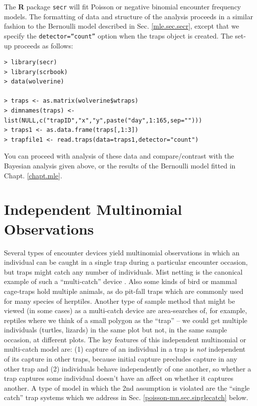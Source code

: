 The {\bf R} package \mbox{\tt secr} will fit Poisson or negative
binomial encounter frequency models. The formatting of data and
structure of the analysis proceeds in a similar fashion to the
Bernoulli model described in Sec. \ref{mle.sec.secr}, except that
we specify the \mbox{\tt detector=``count''} option when the traps
object is created. The set-up proceeds as follows:
\begin{samepage}
{\small
\begin{verbatim}
> library(secr)
> library(scrbook)
> data(wolverine)

> traps <- as.matrix(wolverine$wtraps)
> dimnames(traps) <- list(NULL,c("trapID","x","y",paste("day",1:165,sep="")))
> traps1 <- as.data.frame(traps[,1:3])
> trapfile1 <- read.traps(data=traps1,detector="count")
\end{verbatim}
}
\end{samepage}
You can proceed with analysis of these data and compare/contrast with
the Bayesian analysis given above, or the results of the Bernoulli
model fitted in Chapt. \ref{chapt.mle}.



\section{Independent Multinomial Observations}
\label{poisson-mn.sec.multinomial}

Several types of encounter devices yield multinomial observations in
which an individual can be caught in a single trap during a particular
encounter occasion, but traps might catch any number of individuals.
Mist netting is the canonical example of such a ``multi-catch'' device
\citep{efford_etal:2009euring}. Also some kinds of bird or mammal
cage-traps hold multiple animals, as do pit-fall traps which are
commonly used for many species of herptiles.  Another type of sample
method that might be viewed (in some cases) as a multi-catch device
are area-searches of, for example, reptiles where we think of a small
polygon as the ``trap'' -- we could get multiple individuals (turtles,
lizards) in the same plot but not, in the same sample occasion, at
different plots.  The key features of this independent multinomial or
multi-catch
model are: (1) capture of
an individual in a trap is {\it not} independent of its capture in
other traps, because initial capture precludes capture in any other
trap and (2) individuals behave independently of one another, so
whether a trap captures some individual doesn't have an affect on
whether it captures another.  A type of model in which the 2nd
assumption is violated are the ``single catch'' trap systems which we
address in Sec. \ref{poisson-mn.sec.singlecatch} below. 


